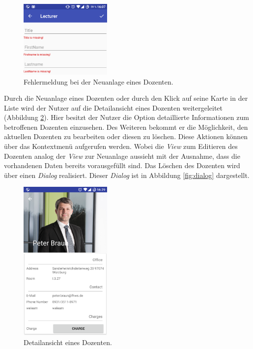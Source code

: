 \begin{figure}[H]
	\begin{center}
		\includegraphics[width=0.4\textwidth]{images/input_error.png}
		\caption{Fehlermeldung bei der Neuanlage eines Dozenten.}
		\label{fig:input_error}
	\end{center}
\end{figure}

Durch die Neuanlage eines Dozenten oder durch den Klick auf seine Karte in der Liste wird der Nutzer auf die Detailansicht eines Dozenten weitergeleitet (Abbildung \ref{fig:detail_view}). Hier besitzt der Nutzer die Option detaillierte Informationen zum betroffenen Dozenten einzusehen. Des Weiteren bekommt er die Möglichkeit, den aktuellen Dozenten zu bearbeiten oder diesen zu löschen. Diese Aktionen können über das Kontextmenü aufgerufen werden. Wobei die \textit{View} zum Editieren des Dozenten analog der \textit{View} zur Neuanlage aussieht mit der Ausnahme, dass die vorhandenen Daten bereits vorausgefüllt sind. Das Löschen des Dozenten wird über einen \textit{Dialog} realisiert. Dieser \textit{Dialog} ist in Abbildung \ref{fig:dialog} dargestellt.

\begin{figure}[H]
	\begin{center}
		\includegraphics[width=0.4\textwidth]{images/detail.png}
		\caption{Detailansicht eines Dozenten.}
		\label{fig:detail_view}
	\end{center}
\end{figure}

